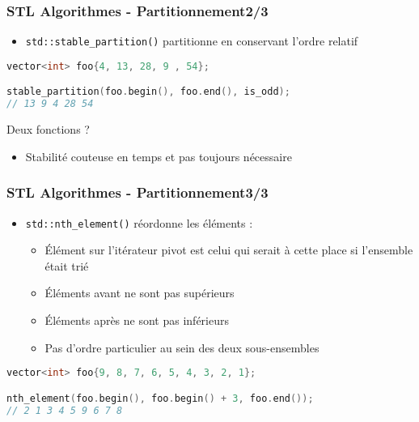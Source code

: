 \documentclass[C++.tex]{subfiles}
\begin{document}
\begin{frame}[fragile]
	\frametitle{STL Algorithmes - Partitionnement\titlehfill{}2/3}
	\begin{itemize}
		\item \lstinline|std::stable_partition()| partitionne en conservant l'ordre relatif
	\end{itemize}

	\begin{lstlisting}[language=C++]
vector<int> foo{4, 13, 28, 9 , 54};

stable_partition(foo.begin(), foo.end(), is_odd);
// 13 9 4 28 54\end{lstlisting}

	\pause

	\begin{block}{Deux fonctions ?}
		\begin{itemize}
			\item Stabilité couteuse en temps et pas toujours nécessaire
		\end{itemize}
	\end{block}
\end{frame}

\begin{frame}[fragile]
	\frametitle{STL Algorithmes - Partitionnement\titlehfill{}3/3}
	\begin{itemize}
		\item \lstinline|std::nth_element()| réordonne les éléments :
		\begin{itemize}
			\item Élément sur l'itérateur pivot est celui qui serait à cette place si l'ensemble était trié
			\item Éléments avant ne sont pas supérieurs
			\item Éléments après ne sont pas inférieurs
			\item Pas d'ordre particulier au sein des deux sous-ensembles
		\end{itemize}
	\end{itemize}


	\begin{lstlisting}[language=C++]
vector<int> foo{9, 8, 7, 6, 5, 4, 3, 2, 1};

nth_element(foo.begin(), foo.begin() + 3, foo.end());
// 2 1 3 4 5 9 6 7 8\end{lstlisting}
\end{frame}
\end{document}
